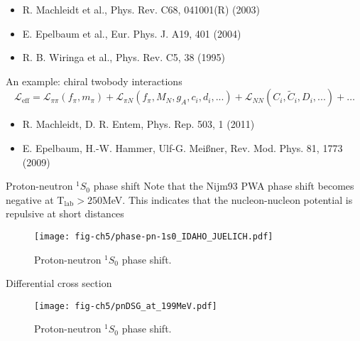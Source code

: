\documentclass[graybox,sectrefs,envcountresetchap,open=right]{svmonodo}
\begin{document}
\noindent
\begin{itemize}
\item R. Machleidt et al., Phys. Rev. C68, 041001(R) (2003)

\item E. Epelbaum et al., Eur. Phys. J. A19, 401 (2004)

\item R. B. Wiringa et al., Phys. Rev. C5, 38 (1995)
\end{itemize}

\noindent
An example: chiral twobody interactions
\[
\mathcal{L_{\mathrm{eff}}} = \mathcal{L}_{\pi \pi}(f_\pi,m_{\pi}) + \mathcal{L}_{\pi N}(f_{\pi},M_{N},g_A,c_i,d_i,...) + \mathcal{L}_{NN}(C_{i},\tilde{C}_{i},D_{i},...) + \ldots
\]
\begin{itemize}
\item R. Machleidt, D. R. Entem, Phys. Rep. 503, 1 (2011)

\item E. Epelbaum, H.-W. Hammer, Ulf-G. Mei\ss{}ner, Rev. Mod. Phys. 81, 1773 (2009)
\end{itemize}

\noindent
Proton-neutron $^1S_0$ phase shift
Note that the Nijm93 PWA phase shift becomes negative at T$_{\mathrm{lab}}> 250$MeV. This indicates that the nucleon-nucleon potential is repulsive at short distances 

\begin{figure}[t]
  \centerline{\texttt{[image: fig-ch5/phase-pn-1s0\_IDAHO\_JUELICH.pdf]}}
  \caption{
  Proton-neutron $^1S_0$ phase shift.
  }
\end{figure}


 Differential cross section

\begin{figure}[t]
  \centerline{\texttt{[image: fig-ch5/pnDSG\_at\_199MeV.pdf]}}
  \caption{
  Proton-neutron $^1S_0$ phase shift.
  }
\end{figure}
\end{document}
